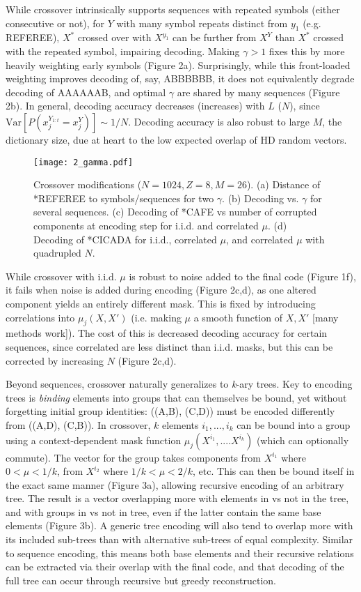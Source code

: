 \documentclass{article}
\begin{document}
While crossover intrinsically supports sequences with repeated symbols (either consecutive or not), for $Y$ with many symbol repeats distinct from $y_1$ (e.g. REFEREE), $X^*$ crossed over with $X^{y_1}$ can be further from $X^Y$ than $X^*$ crossed with the repeated symbol, impairing decoding. Making $\gamma > 1$ fixes this by more heavily weighting early symbols (Figure 2a). Surprisingly, while this front-loaded weighting improves decoding of, say, ABBBBBB, it does not equivalently degrade decoding of AAAAAAB, and optimal $\gamma$ are shared by many sequences (Figure 2b). In general, decoding accuracy decreases (increases) with $L$ ($N$), since $\textrm{Var}[P(x_j^{Y_{1:t}} = x_j^Y)] \sim 1/N$. Decoding accuracy is also robust to large $M$, the dictionary size, due at heart to the low expected overlap of HD random vectors.

\begin{figure}
\label{fig:2}
  \centering
  \texttt{[image: 2\_gamma.pdf]}
  \caption{Crossover modifications ($N=1024, Z=8, M=26$). (a) Distance of *REFEREE to symbols/sequences for two $\gamma$. (b) Decoding vs. $\gamma$ for several sequences. (c) Decoding of *CAFE vs number of corrupted components at encoding step for i.i.d. and correlated $\mu$. (d) Decoding of *CICADA for i.i.d., correlated $\mu$, and correlated $\mu$ with quadrupled $N$.}
\end{figure}

While crossover with i.i.d. $\mu$ is robust to noise added to the final code (Figure 1f), it fails when noise is added during encoding (Figure 2c,d), as one altered component yields an entirely different mask. This is fixed by introducing correlations into $\mu_j(X, X')$ (i.e. making $\mu$ a smooth function of $X, X'$ [many methods work]). The cost of this is decreased decoding accuracy for certain sequences, since correlated are less distinct than i.i.d. masks, but this can be corrected by increasing $N$ (Figure 2c,d).

Beyond sequences, crossover naturally generalizes to \textit{k}-ary trees. Key to encoding trees is \textit{binding} elements into groups that can themselves be bound, yet without forgetting initial group identities: ((A,B), (C,D)) must be encoded differently from ((A,D), (C,B)). In crossover, $k$ elements $i_1, ..., i_k$ can be bound into a group using a context-dependent mask function $\mu_j(X^{i_1}, .... X^{i_k})$ (which can optionally commute). The vector for the group takes components from $X^{i_1}$ where $0 < \mu < 1/k$, from $X^{i_2}$ where $1/k < \mu < 2/k$, etc. This can then be bound itself in the exact same manner (Figure 3a), allowing recursive encoding of an arbitrary tree. The result is a vector overlapping more with elements in vs not in the tree, and with groups in vs not in tree, even if the latter contain the same base elements (Figure 3b). A generic tree encoding will also tend to overlap more with its included sub-trees than with alternative sub-trees of equal complexity. Similar to sequence encoding, this means both base elements and their recursive relations can be extracted via their overlap with the final code, and that decoding of the full tree can occur through recursive but greedy reconstruction.
\end{document}
